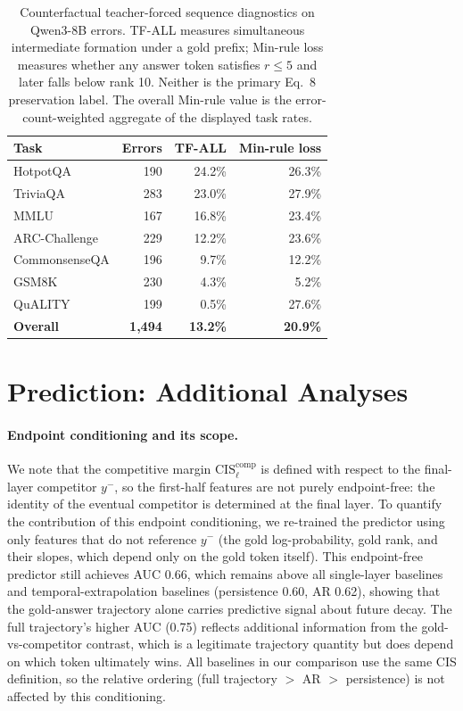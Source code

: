 \documentclass{article} %
\begin{document}
\begin{table}[h]
\centering
\caption{Counterfactual teacher-forced sequence diagnostics on Qwen3-8B errors. TF-ALL measures simultaneous intermediate formation under a gold prefix; Min-rule loss measures whether any answer token satisfies $r\leq5$ and later falls below rank 10. Neither is the primary Eq.~8 preservation label. The overall Min-rule value is the error-count-weighted aggregate of the displayed task rates.}
\label{tab:taskdecay}
\begin{tabular}{lrrr}
\toprule
\textbf{Task} & \textbf{Errors} & \textbf{TF-ALL} & \textbf{Min-rule loss} \\
\midrule
HotpotQA & 190 & 24.2\% & 26.3\% \\
TriviaQA & 283 & 23.0\% & 27.9\% \\
MMLU & 167 & 16.8\% & 23.4\% \\
ARC-Challenge & 229 & 12.2\% & 23.6\% \\
CommonsenseQA & 196 & 9.7\% & 12.2\% \\
GSM8K & 230 & 4.3\% & 5.2\% \\
QuALITY & 199 & 0.5\% & 27.6\% \\
\midrule
\textbf{Overall} & \textbf{1{,}494} & \textbf{13.2\%} & \textbf{20.9\%} \\
\bottomrule
\end{tabular}
\end{table}

\section{Prediction: Additional Analyses}
\label{app:prediction}

\paragraph{Endpoint conditioning and its scope.}
We note that the competitive margin $\mathrm{CIS}^{\mathrm{comp}}_\ell$ is defined with respect to the final-layer competitor $y^-$, so the first-half features are not purely endpoint-free: the identity of the eventual competitor is determined at the final layer. To quantify the contribution of this endpoint conditioning, we re-trained the predictor using only features that do not reference $y^-$ (the gold log-probability, gold rank, and their slopes, which depend only on the gold token itself). This endpoint-free predictor still achieves AUC 0.66, which remains above all single-layer baselines and temporal-extrapolation baselines (persistence 0.60, AR 0.62), showing that the gold-answer trajectory alone carries predictive signal about future decay. The full trajectory's higher AUC (0.75) reflects additional information from the gold-vs-competitor contrast, which is a legitimate trajectory quantity but does depend on which token ultimately wins. All baselines in our comparison use the same CIS definition, so the relative ordering (full trajectory $>$ AR $>$ persistence) is not affected by this conditioning.
\end{document}
